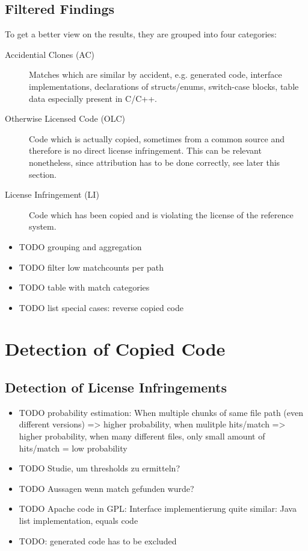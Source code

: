 \subsection{Filtered Findings}
To get a better view on the results, they are grouped into four categories:
\begin{description}
	\item [Accidential Clones (AC)]
		Matches which are similar by \glqq accident\grqq, e.g. generated code, interface implementations, declarations of structs/enums, switch-case blocks, table data especially present in C/C++.
	\item[Otherwise Licensed Code (OLC)]
		Code which is actually copied, sometimes from a common source and therefore is no direct license infringement.
		This can be relevant nonetheless, since attribution has to be done correctly, see later this section. %
	\item[License Infringement (LI)]
		Code which has been copied and is violating the license of the reference system.
\end{description}

\begin{itemize}
	\item TODO grouping and aggregation
	\item TODO filter low matchcounts per path
	\item TODO table with match categories
	\item TODO list special cases: reverse copied code
\end{itemize}


\section{Detection of Copied Code} %
\subsection{Detection of License Infringements} %
\begin{itemize}
	\item TODO probability estimation: When multiple chunks of same file path (even different versions) => higher probability, when mulitple hits/match => higher probability, when many different files, only small amount of hits/match = low probability
	\item TODO Studie, um thresholds zu ermitteln?
	\item TODO Aussagen wenn match gefunden wurde?
	\item TODO Apache code in GPL: Interface implementierung quite similar: Java list implementation, equals code 
	\item TODO: generated code has to be excluded
\end{itemize}

